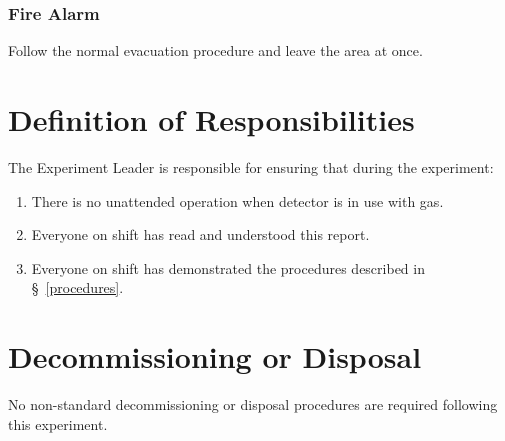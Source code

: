 \subsubsection{Fire Alarm}
Follow the normal evacuation procedure and leave the area at once.

\section{Definition of Responsibilities}
The Experiment Leader is responsible for ensuring that during the experiment:
\begin{enumerate}
\setlength{\itemsep}{0pt}
\setlength{\parskip}{0pt}
\setlength{\parsep}{0pt}
\item  There is no unattended operation when detector is in use with gas.
\item  Everyone on shift has read and understood this report.
\item  Everyone on shift has demonstrated the procedures described in \S~\ref{procedures}.
\end{enumerate}

\section{Decommissioning or Disposal}
No non-standard decommissioning or disposal procedures are required following this experiment.

 



